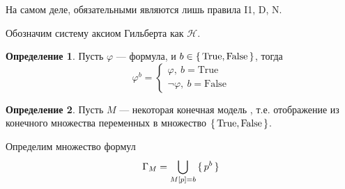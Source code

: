 \documentclass[12pt]{article}
\let\n\neg
\theoremstyle{definition}
\newtheorem{definition}{Определение}[section]
\theoremstyle{statement}
\theoremstyle{theorem}
\begin{document}
На самом деле, обязательными являются лишь правила I1, D, N.

Обозначим систему аксиом Гильберта как $\mathcal{H}$.

\begin{definition}
  Пусть $\varphi$ --- формула, и $b \in \set{\mathrm{True},
  \mathrm{False}}$, тогда
  \[
    \varphi^b =
    \begin{cases}
      \varphi,\ b = \mathrm{True}\\
      \n \varphi,\ b = \mathrm{False}
    \end{cases}
  \]
\end{definition}

\begin{definition}
  Пусть $M$ --- некоторая конечная модель , т.е. отображение из
  конечного множества переменных в множество $\set{\mathrm{True},
  \mathrm{False}}$.

  Определим множество формул
  \[
    \Gamma_M = \bigcup_{M[p] = b} \set{p^b}
  \]
\end{definition}
\end{document}
